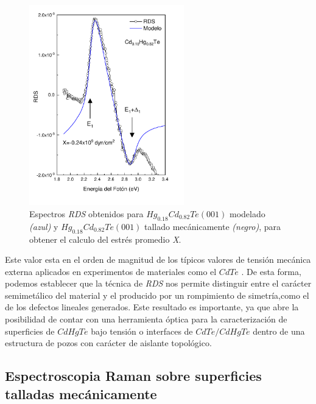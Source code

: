 \begin{figure}[H]
    \centering
    \includegraphics[width=0.6\textwidth]{figures/chap4/hgcdte-strained/rds-results/hgcdte_rds_stress.pdf}
        \caption{Espectros \textit{RDS} obtenidos para $ Hg_{0.18}Cd_{0.82}Te (001)$ modelado \textit{(azul)} y 
        $ Hg_{0.18}Cd_{0.82}Te (001)$ tallado mecánicamente \textit{(negro)}, para obtener el calculo del estrés
        promedio \textit{X}.}
    \label{fig:hgcdte_rds_stress}
\end{figure}

Este valor esta en el orden de magnitud de los típicos valores de tensión mecánica externa aplicados en experimentos de materiales como el $ CdTe $ \cite{LastrasMartnez2010}. De esta forma, podemos establecer que la técnica de \textit{RDS} nos permite distinguir entre el carácter semimetálico del material y el producido por un rompimiento de simetría,como el de los defectos lineales generados. Este resultado es importante, ya que abre la posibilidad de contar con una herramienta óptica para la caracterización de superficies de $ CdHgTe $ bajo tensión o interfaces de $ CdTe/CdHgTe $ dentro de una estructura de pozos con carácter de aislante topológico.

\subsection{Espectroscopia Raman sobre superficies talladas mecánicamente}
\label{sec:chap4-hgcdte-raman}

